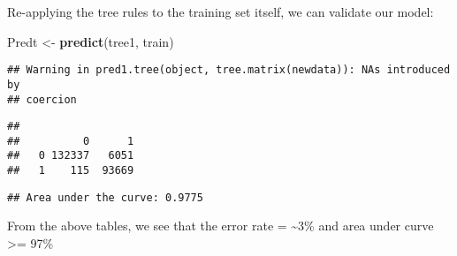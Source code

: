 \documentclass[]{article}
\newenvironment{Shaded}{\begin{snugshade}}{\end{snugshade}}
\newcommand{\KeywordTok}[1]{\textcolor[rgb]{0.13,0.29,0.53}{\textbf{#1}}}
\newcommand{\DataTypeTok}[1]{\textcolor[rgb]{0.13,0.29,0.53}{#1}}
\newcommand{\DecValTok}[1]{\textcolor[rgb]{0.00,0.00,0.81}{#1}}
\newcommand{\FloatTok}[1]{\textcolor[rgb]{0.00,0.00,0.81}{#1}}
\newcommand{\StringTok}[1]{\textcolor[rgb]{0.31,0.60,0.02}{#1}}
\newcommand{\CommentTok}[1]{\textcolor[rgb]{0.56,0.35,0.01}{\textit{#1}}}
\newcommand{\OperatorTok}[1]{\textcolor[rgb]{0.81,0.36,0.00}{\textbf{#1}}}
\newcommand{\NormalTok}[1]{#1}
\begin{document}
Re-applying the tree rules to the training set itself, we can validate
our model:

\begin{Shaded}
\begin{Highlighting}[]
\NormalTok{Predt <-}\StringTok{ }\KeywordTok{predict}\NormalTok{(tree1, train)}
\end{Highlighting}
\end{Shaded}

\begin{verbatim}
## Warning in pred1.tree(object, tree.matrix(newdata)): NAs introduced by
## coercion
\end{verbatim}

\begin{Shaded}
\end{Shaded}

\begin{verbatim}
##    
##          0      1
##   0 132337   6051
##   1    115  93669
\end{verbatim}

\begin{Shaded}
\end{Shaded}

\begin{verbatim}
## Area under the curve: 0.9775
\end{verbatim}

From the above tables, we see that the error rate = \textasciitilde{}3\%
and area under curve \textgreater{}= 97\%
\end{document}
